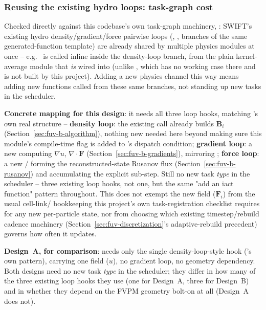 \subsubsection{Reusing the existing hydro loops: task-graph cost}
\label{sec:fuv-b-tasks}

Checked directly against this codebase's own task-graph machinery,
: SWIFT's existing hydro
density/gradient/force pairwise loops (,
,  branches of the
same generated-function template) are already shared by multiple
physics modules at once -- e.g.\  is
called inline inside the density-loop branch, from the plain
 kernel-average module that \emph{is} wired into
 (unlike , which has no
working  case there and is not built by this
project). Adding a new physics channel this way means adding new
 functions called from these same branches, not
standing up new tasks in the scheduler.

\textbf{Concrete mapping for this design}: it needs all three loop
hooks, matching 's own real structure --
\textbf{density loop}: the existing 
call already builds $\mathbf B_i$ (Section~\ref{sec:fuv-b-algorithm}),
nothing new needed here beyond making sure this module's compile-time
flag is added to 's dispatch condition;
\textbf{gradient loop}: a new 
computing $\nabla u$, $\nabla\cdot\mathbf F$ (Section~\ref{sec:fuv-b-gradients}),
mirroring ; \textbf{force loop}: a
new / forming
the reconstructed-state Rusanov flux (Section~\ref{sec:fuv-b-rusanov})
and accumulating the explicit sub-step. Still no new task \emph{type}
in the scheduler -- three existing loop hooks, not one, but the same
"add an iact function" pattern throughout. This does not exempt the new
field ($\mathbf F_i$) from the usual cell-link/
bookkeeping this project's own task-registration checklist requires for
any new per-particle state, nor from choosing which existing
timestep/rebuild cadence machinery
(Section~\ref{sec:fuv-discretization}'s adaptive-rebuild precedent)
governs how often it updates.

\textbf{Design~A, for comparison}: needs only the single
density-loop-style hook ('s own pattern),
carrying one field ($u$), no gradient loop, no geometry dependency.
Both designs need no new task \emph{type} in the scheduler; they differ
in how many of the three existing loop hooks they use (one for
Design~A, three for Design~B) and in whether they depend on the FVPM
geometry bolt-on at all (Design~A does not).

